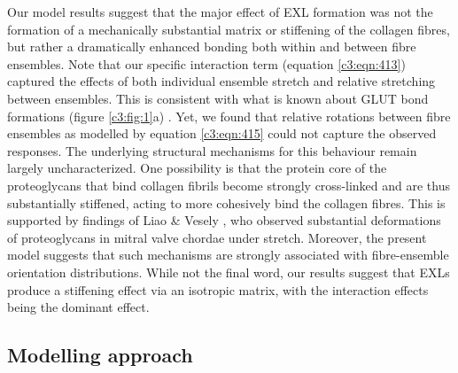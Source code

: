     
    Our model results suggest that the major effect of EXL formation was not the formation of a mechanically substantial matrix or stiffening of the collagen fibres, but rather a dramatically enhanced bonding both within and between fibre ensembles. Note that our specific interaction term (equation \ref{c3:eqn:413}) captured the effects of both individual ensemble stretch and relative stretching between ensembles. This is consistent with what is known about GLUT bond formations (figure \ref{c3:fig:1}a) \cite{nimni_chemically_1987,cheung_mechanism_1985,cheung_presence_1983,cheung_mechanism_1982,cheung_mechanism_1982II}. Yet, we found that relative rotations between fibre ensembles as modelled by equation \ref{c3:eqn:415} could not capture the observed responses. The underlying structural mechanisms for this behaviour remain largely uncharacterized. One possibility is that the protein core of the proteoglycans that bind collagen fibrils become strongly cross-linked and are thus substantially stiffened, acting to more cohesively bind the collagen fibres. This is supported by findings of Liao \& Vesely \cite{liao_relationship_2004}, who observed substantial deformations of proteoglycans in mitral valve chordae under stretch. Moreover, the present model suggests that such mechanisms are strongly associated with fibre-ensemble orientation distributions. While not the final word, our results suggest that EXLs produce a stiffening effect via an isotropic matrix, with the interaction effects being the dominant effect.
    
    


\subsection{Modelling approach}

